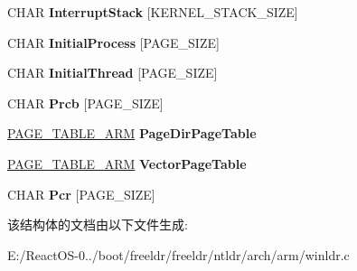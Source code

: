 \begin{DoxyCompactItemize}
C\+H\+AR {\bfseries Interrupt\+Stack} \mbox{[}K\+E\+R\+N\+E\+L\+\_\+\+S\+T\+A\+C\+K\+\_\+\+S\+I\+ZE\mbox{]}
\item 
\mbox{\label{struct___k_p_d_r___p_a_g_e_ad61b3103c3eb61001de8bba971625ce6}} 
C\+H\+AR {\bfseries Initial\+Process} \mbox{[}P\+A\+G\+E\+\_\+\+S\+I\+ZE\mbox{]}
\item 
\mbox{\label{struct___k_p_d_r___p_a_g_e_a949e6f3f2edf2f8f5268db0e5fc240fb}} 
C\+H\+AR {\bfseries Initial\+Thread} \mbox{[}P\+A\+G\+E\+\_\+\+S\+I\+ZE\mbox{]}
\item 
\mbox{\label{struct___k_p_d_r___p_a_g_e_a76c9248ddc3a20cae41fbf3aa48be475}} 
C\+H\+AR {\bfseries Prcb} \mbox{[}P\+A\+G\+E\+\_\+\+S\+I\+ZE\mbox{]}
\item 
\mbox{\label{struct___k_p_d_r___p_a_g_e_a1eea43228017d70d35c5f3e2ecae6022}} 
\hyperlink{struct___p_a_g_e___t_a_b_l_e___a_r_m}{P\+A\+G\+E\+\_\+\+T\+A\+B\+L\+E\+\_\+\+A\+RM} {\bfseries Page\+Dir\+Page\+Table}
\item 
\mbox{\label{struct___k_p_d_r___p_a_g_e_a6342879f96e137540ddfa11f9548c60f}} 
\hyperlink{struct___p_a_g_e___t_a_b_l_e___a_r_m}{P\+A\+G\+E\+\_\+\+T\+A\+B\+L\+E\+\_\+\+A\+RM} {\bfseries Vector\+Page\+Table}
\item 
\mbox{\label{struct___k_p_d_r___p_a_g_e_a47e7705826956e7ea175fdd0dba49b6d}} 
C\+H\+AR {\bfseries Pcr} \mbox{[}P\+A\+G\+E\+\_\+\+S\+I\+ZE\mbox{]}
\end{DoxyCompactItemize}


该结构体的文档由以下文件生成\+:\begin{DoxyCompactItemize}
\item 
E\+:/\+React\+O\+S-\/0../boot/freeldr/freeldr/ntldr/arch/arm/winldr.\+c\end{DoxyCompactItemize}
